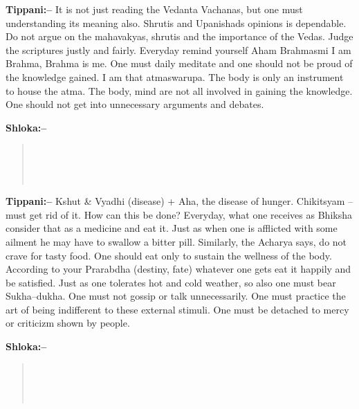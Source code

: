 \textbf{Tippani:–} It is not just reading the Vedanta Vachanas, but one must understanding its meaning also. Shrutis and Upanishads opinions is dependable. Do not argue on the mahavakyas, shrutis and the importance of the Vedas. Judge the scriptures justly and fairly. Everyday remind yourself Aham Brahmasmi I am Brahma, Brahma is me. One must daily meditate and one should not be proud of the knowledge gained. I am that atmaswarupa. The body is only an instrument to house the atma. The body, mind are not all involved in gaining the knowledge. One should not get into unnecessary arguments and debates.

\textbf{Shloka:–}

\begin{verse}
 \\\\\\ 
\end{verse}

\textbf{Tippani:–} Kshut \& Vyadhi (disease) + Aha, the disease of hunger. Chikitsyam – must get rid of it. How can this be done? Everyday, what one receives as Bhiksha consider that as a medicine and eat it. Just as when one is afflicted with some ailment he may have to swallow a bitter pill. Similarly, the Acharya says, do not crave for tasty food. One should eat only to sustain the wellness of the body. According to your Prarabdha (destiny, fate) whatever one gets eat it happily and be satisfied. Just as one tolerates hot and cold weather, so also one must bear Sukha–dukha. One must not gossip or talk unnecessarily. One must practice the art of being indifferent to these external stimuli. One must be detached to mercy or criticizm shown by people.

\textbf{Shloka:–}

\begin{verse}
 \\\\\\ 
\end{verse}


